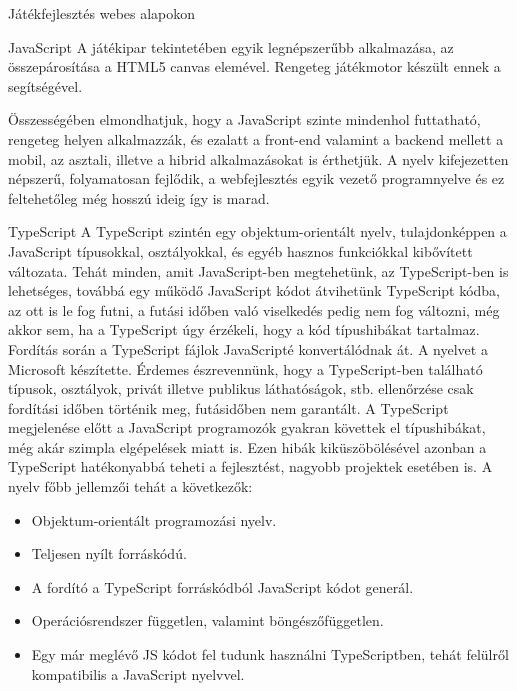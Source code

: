 \begin{MyChapter}{Játékfejlesztés webes alapokon}
\begin{MySection}{JavaScript}
		A játékipar tekintetében egyik legnépszerűbb alkalmazása, az összepárosítása a HTML5 canvas elemével. Rengeteg játékmotor készült ennek a segítségével.
		
		Összességében elmondhatjuk, hogy a JavaScript szinte mindenhol futtatható, rengeteg helyen alkalmazzák, és ezalatt a front-end valamint a backend mellett a mobil, az asztali, illetve a hibrid alkalmazásokat is érthetjük. A nyelv kifejezetten népszerű, folyamatosan fejlődik, a webfejlesztés egyik vezető programnyelve és ez feltehetőleg még hosszú ideig így is marad.
		\cite{javascript_future}
	\end{MySection}

	\begin{MySection}{TypeScript}
		A TypeScript szintén egy objektum-orientált nyelv, tulajdonképpen a JavaScript típusokkal, osztályokkal, és egyéb hasznos funkciókkal kibővített változata. Tehát minden, amit JavaScript-ben megtehetünk, az TypeScript-ben is lehetséges, továbbá egy működő JavaScript kódot átvihetünk TypeScript kódba, az ott is le fog futni, a futási időben való viselkedés pedig nem fog változni, még akkor sem, ha a TypeScript úgy érzékeli, hogy a kód típushibákat tartalmaz. Fordítás során a TypeScript fájlok JavaScripté konvertálódnak át. A nyelvet a Microsoft készítette. Érdemes észrevennünk, hogy a TypeScript-ben található típusok, osztályok, privát illetve publikus láthatóságok, stb. ellenőrzése csak fordítási időben történik meg, futásidőben nem garantált.
		A TypeScript megjelenése előtt a JavaScript programozók gyakran követtek el típushibákat, még akár szimpla elgépelések miatt is. Ezen hibák kiküszöbölésével azonban a TypeScript hatékonyabbá teheti a fejlesztést, nagyobb projektek esetében is.
		\cite{typescript}
		\newline \newline
		A nyelv főbb jellemzői tehát a következők:
		\begin{itemize}
			\item Objektum-orientált programozási nyelv.
			\item Teljesen nyílt forráskódú.
			\item A fordító a TypeScript forráskódból JavaScript kódot generál.
			\item Operációsrendszer független, valamint böngészőfüggetlen.
			\item Egy már meglévő JS kódot fel tudunk használni TypeScriptben, tehát felülről kompatibilis a JavaScript nyelvvel.
		\end{itemize}
	\end{MySection}


\end{MyChapter}
